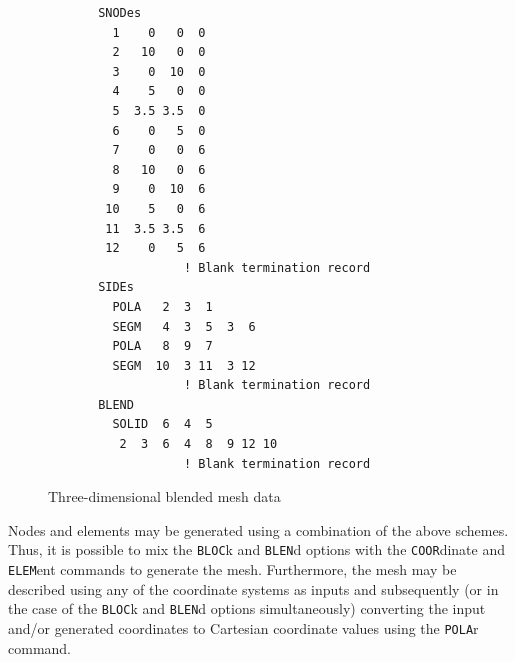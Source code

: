 \begin{figure}[ht!]
\begin{verbatim}
       SNODes
         1    0   0  0
         2   10   0  0
         3    0  10  0
         4    5   0  0
         5  3.5 3.5  0
         6    0   5  0
         7    0   0  6
         8   10   0  6
         9    0  10  6
        10    5   0  6
        11  3.5 3.5  6
        12    0   5  6
                   ! Blank termination record
       SIDEs
         POLA   2  3  1
         SEGM   4  3  5  3  6
         POLA   8  9  7
         SEGM  10  3 11  3 12
                   ! Blank termination record
       BLEND
         SOLID  6  4  5
          2  3  6  4  8  9 12 10
                   ! Blank termination record
\end{verbatim}
\caption{Three-dimensional blended mesh data}
\label{figb4}
\end{figure}

Nodes and elements may be generated using a combination of the
above schemes.  Thus, it is possible to mix the {\tt BLOC}k and
{\tt BLEN}d options with the
{\tt COOR}d\-in\-ate and {\tt ELEM}\-ent commands to generate the mesh.
Furthermore,
the mesh may be described using any of the coordinate systems as inputs
and subsequently (or in the case of the {\tt BLOC}k 
and {\tt BLEN}d options simultaneously)
converting the input and/or generated coordinates to Cartesian coordinate
values using the {\tt POLA}r command.
